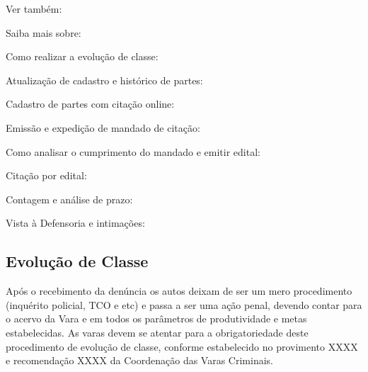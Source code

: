 \documentclass[letterpaper,10pt,brazil]{sphinxmanual}
\begin{document}
\begin{sphinxseealso}{Ver também:}

\sphinxAtStartPar
Saiba mais sobre:

\sphinxAtStartPar
Como realizar a evolução de classe: {\hyperref[\detokenize{projud_19_evolucao_retificacao::doc}]{}}

\sphinxAtStartPar
Atualização de cadastro e histórico de partes: {\hyperref[\detokenize{projud_23_cadastroparte::doc}]{}}

\sphinxAtStartPar
Cadastro de partes com citação online: {\hyperref[\detokenize{projud_24_cadastropartecitacaoonline::doc}]{}}

\sphinxAtStartPar
Emissão e expedição de mandado de citação: {\hyperref[\detokenize{projud_32_expedicaomandado::doc}]{}}

\sphinxAtStartPar
Como analisar o cumprimento do mandado e emitir edital: {\hyperref[\detokenize{projud_33_ordenarcumprimento::doc}]{}}

\sphinxAtStartPar
Citação por edital: {\hyperref[\detokenize{projud_44_cartaprecatoriaeletronica::doc}]{}}

\sphinxAtStartPar
Contagem e análise de prazo: {\hyperref[\detokenize{projud_31_contagemprazo::doc}]{}}

\sphinxAtStartPar
Vista à Defensoria e intimações: {\hyperref[\detokenize{projud_34_intimarperitooj::doc}]{}}


\end{sphinxseealso}



\subsection{Evolução de Classe}
\label{\detokenize{03recebimento_denuncia:evolucao-de-classe}}
\sphinxAtStartPar
Após o recebimento da denúncia os autos deixam de ser um mero procedimento (inquérito policial, TCO e etc) e passa a ser uma ação penal, devendo contar para o acervo da Vara e em todos os parâmetros de produtividade e metas estabelecidas.
As varas devem se atentar para a obrigatoriedade deste procedimento de evolução de classe, conforme estabelecido no provimento XXXX e recomendação XXXX da Coordenação das Varas Criminais.
\end{document}
